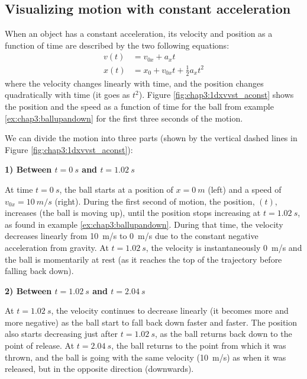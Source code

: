 \subsection{Visualizing motion with constant acceleration}

When an object has a constant acceleration, its velocity and position as a function of time are described by the two following equations:
\begin{align*}
v(t) &= v_{0x} + a_xt\\
x(t) &= x_0+v_{0x}t+ \frac{1}{2}a_xt^2
\end{align*}
where the velocity changes linearly with time, and the position changes quadratically with time (it goes as $t^2$). Figure \ref{fig:chap3:1dxvvst_aconst} shows the position and the speed as a function of time for the ball from example \ref{ex:chap3:ballupandown} for the first three seconds of the motion.


We can divide the motion into three parts (shown by the vertical dashed lines in Figure \ref{fig:chap3:1dxvvst_aconst}):

\textbf{1) Between $t=\SI{0}{s}$ and $t=\SI{1.02}{s}$}

At time $t=\SI{0}{s}$, the ball starts at a position of $x=\SI{0}{m}$ (left) and a speed of $v_{0x}=\SI{10}{m/s}$ (right). During the first second of motion, the position, $(t)$, increases (the ball is moving up), until the position stops increasing at $t=\SI{1.02}{s}$, as found in example \ref{ex:chap3:ballupandown}. During that time, the velocity decreases linearly from \SI{10}{m/s} to \SI{0}{m/s} due to the constant negative acceleration from gravity. At $t=\SI{1,02}{s}$, the velocity is instantaneously \SI{0}{m/s} and the ball is momentarily at rest (as it reaches the top of the trajectory before falling back down).

\textbf{2) Between $t=\SI{1.02}{s}$ and $t=\SI{2.04}{s}$}

At $t=\SI{1.02}{s}$, the velocity continues to decrease linearly (it becomes more and more negative) as the ball start to fall back down faster and faster. The position also starts decreasing just after $t=\SI{1,02}{s}$, as the ball returns back down to the point of release. At $t=\SI{2.04}{s}$, the ball returns to the point from which it was thrown, and the ball is going with the same velocity (\SI{10}{m/s}) as when it was released, but in the opposite direction (downwards).

